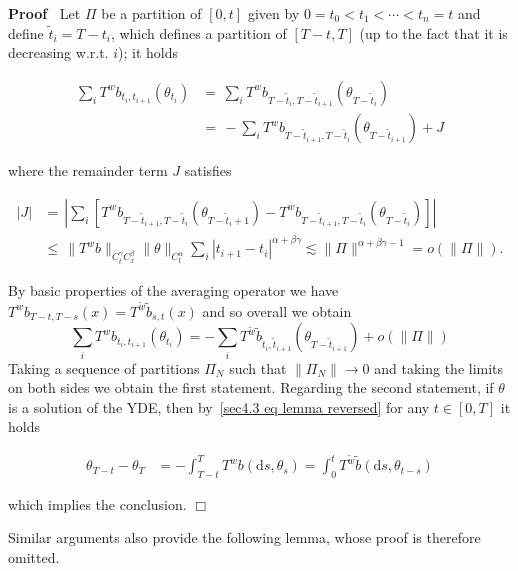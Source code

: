 \documentclass[10pt]{article}
\newcommand{\mathd}{\mathrm{d}}
\newenvironment{proof}{\noindent\textbf{Proof\ }}{\hspace*{\fill}$\Box$\medskip}
\begin{document}
\begin{proof}
  Let $\Pi$ be a partition of $[0, t]$ given by $0 = t_0 < t_1 < \cdots < t_n
  = t$ and define $\tilde{t}_i = T - t_i$, which defines a partition of $[T -
  t, T]$ (up to the fact that it is decreasing w.r.t. $i$); it holds
  
  \begin{align*}
    \sum_i T^w b_{t_i, t_{i + 1}} (\theta_{t_i}) & = \, \sum_i T^w b_{T -
    \tilde{t}_i, T - \tilde{t}_{i + 1}} (\theta_{T - \tilde{t}_i})\\
    & = \, - \sum_i T^w b_{T - \tilde{t}_{i + 1}, T - \tilde{t}_i} (\theta_{T
    - \tilde{t}_{i + 1}}) + J
  \end{align*}
  
  where the remainder term $J$ satisfies
  
  \begin{align*}
    | J | & = \, \left| \sum_i [T^w b_{T - \tilde{t}_{i + 1}, T - \tilde{t}_i}
    (\theta_{T - \tilde{t}_i + 1}) - T^w b_{T - \tilde{t}_{i + 1}, T -
    \tilde{t}_i} (\theta_{T - \tilde{t}_i})] \right|\\
    & \leqslant \, \| T^w b \|_{C^{\gamma}_t C^{\beta}_x}  \| \theta
    \|_{C_t^{\alpha}} \sum_i | t_{i + 1} - t_i |^{\alpha + \beta \gamma}
    \lesssim \| \Pi \|^{\alpha + \beta \gamma - 1} = o (\| \Pi \|) .
  \end{align*}
  
  By basic properties of the averaging operator we have $T^w b_{T - t, T - s}
  (x) = T^{\tilde{w}} \tilde{b}_{s, t} (x)$ and so overall we obtain
  \[ \sum_i T^w b_{t_i, t_{i + 1}} (\theta_{t_i}) = - \sum_i T^{\tilde{w}}
     \tilde{b}_{\tilde{t}_i, \tilde{t}_{i + 1}} (\theta_{T - \tilde{t}_{i +
     1}}) + o (\| \Pi \|) \]
  Taking a sequence of partitions $\Pi_N$ such that $\| \Pi_N \| \rightarrow
  0$ and taking the limits on both sides we obtain the first statement.
  Regarding the second statement, if $\theta$ is a solution of the YDE, then
  by~{\eqref{sec4.3 eq lemma reversed}} for any $t \in [0, T]$ it holds
  
  \begin{align*}
    \theta_{T - t} - \theta_T & = - \int_{T - t}^T T^w b (\mathd s, \theta_s)
    = \int_0^t T^{\tilde{w}} \tilde{b} (\mathd s, \theta_{t - s})
  \end{align*}
  
  which implies the conclusion.
\end{proof}

Similar arguments also provide the following lemma, whose proof is therefore
omitted.
\end{document}
